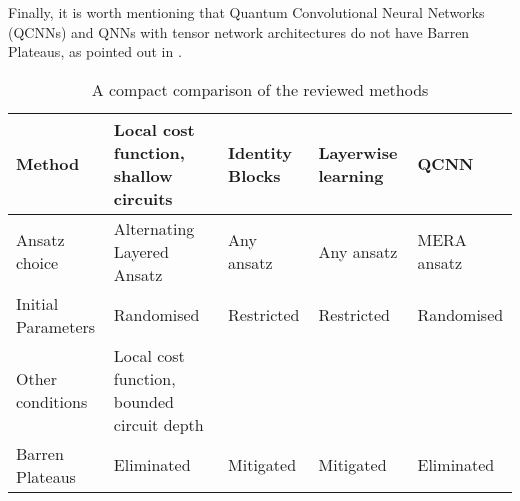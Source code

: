 Finally, it is worth mentioning that Quantum Convolutional Neural Networks (QCNNs) and QNNs with tensor network architectures do not have Barren Plateaus, as pointed out in \cite{congQuantumConvolutionalNeural2019}.

\begin{table}[]
    \centering
    \begin{tabular}{|l|p{2cm}|p{2cm}|p{2cm}|p{2cm}|}
        \hline
        Method              & Local cost function, shallow circuits & Identity Blocks   & Layerwise learning    & QCNN \\
        \hline
        Ansatz choice       & Alternating Layered Ansatz            & Any ansatz        & Any ansatz            & MERA ansatz\\
        \hline
        Initial Parameters  & Randomised                            & Restricted        & Restricted            & Randomised \\
        \hline
        Other conditions    & Local cost function, bounded circuit depth &              &                       & \\
        \hline
        Barren Plateaus     & Eliminated                            & Mitigated         & Mitigated             & Eliminated \\
        \hline
    \end{tabular}
    \caption{A compact comparison of the reviewed methods}
    \label{tab:my_label}
\end{table}
